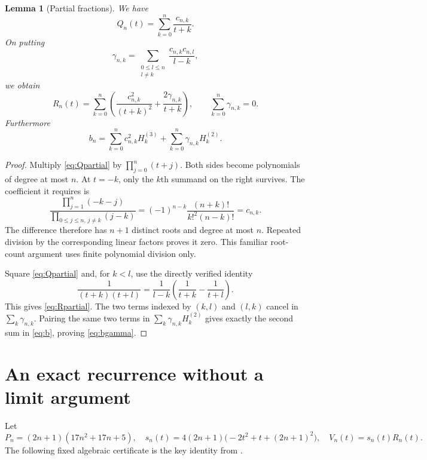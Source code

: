\documentclass[11pt]{article}
\newtheorem{lemma}[theorem]{Lemma}
\theoremstyle{definition}\newtheorem{definition}[theorem]{Definition}
\theoremstyle{remark}\newtheorem{remark}[theorem]{Remark}
\newcommand{\HH}[2]{H_{#1}^{(#2)}}
\begin{document}
\begin{lemma}[Partial fractions]\label{lem:partial}
We have
\begin{equation}\label{eq:Qpartial}
 Q_n(t)=\sum_{k=0}^{n}\frac{c_{n,k}}{t+k}.
\end{equation}
On putting
\begin{equation}\label{eq:gamma}
 \gamma_{n,k}=\sum_{\substack{0\le l\le n\\l\ne k}}
                  \frac{c_{n,k}c_{n,l}}{l-k},
\end{equation}
we obtain
\begin{equation}\label{eq:Rpartial}
 R_n(t)=\sum_{k=0}^{n}\left(
       \frac{c_{n,k}^2}{(t+k)^2}+\frac{2\gamma_{n,k}}{t+k}\right),
 \qquad\sum_{k=0}^{n}\gamma_{n,k}=0.
\end{equation}
Furthermore
\begin{equation}\label{eq:bgamma}
 b_n=\sum_{k=0}^{n}c_{n,k}^2\HH{k}{3}
                   +\sum_{k=0}^{n}\gamma_{n,k}\HH{k}{2}.
\end{equation}
\end{lemma}
\begin{proof}
Multiply \eqref{eq:Qpartial} by $\prod_{j=0}^{n}(t+j)$. Both sides become
polynomials of degree at most $n$. At $t=-k$, only the $k$th summand on the
right survives. The coefficient it requires is
\[
 \frac{\prod_{j=1}^{n}(-k-j)}{\prod_{0\le j\le n,\,j\ne k}(j-k)}
 =(-1)^{n-k}\frac{(n+k)!}{k!^2(n-k)!}=c_{n,k}.
\]
The difference therefore has $n+1$ distinct roots and degree at most $n$.
Repeated division by the corresponding linear factors proves it zero.
This familiar root-count argument uses finite polynomial division only.

Square \eqref{eq:Qpartial} and, for $k<l$, use the directly verified identity
\[
 \frac1{(t+k)(t+l)}=
 \frac1{l-k}\left(\frac1{t+k}-\frac1{t+l}\right).
\]
This gives \eqref{eq:Rpartial}. The two terms indexed by $(k,l)$ and
$(l,k)$ cancel in $\sum_k\gamma_{n,k}$. Pairing the same two terms in
$\sum_k\gamma_{n,k}\HH{k}{2}$ gives exactly the second sum in
\eqref{eq:b}, proving \eqref{eq:bgamma}.
\end{proof}

\section{An exact recurrence without a limit argument}\label{sec:recurrence}
Let
\begin{equation}\label{eq:telescoper-def}
 P_n=(2n+1)(17n^2+17n+5),\quad
 s_n(t)=4(2n+1)\bigl(-2t^2+t+(2n+1)^2\bigr),\quad
 V_n(t)=s_n(t)R_n(t).
\end{equation}
The following fixed algebraic certificate is the key identity from
\cite{Zudilin}.
\end{document}

